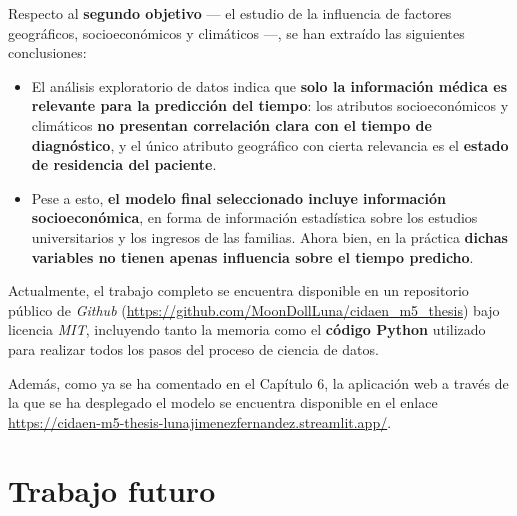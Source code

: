 Respecto al \textbf{segundo objetivo} --- el estudio de la influencia de factores geográficos, socioeconómicos y climáticos ---, se han extraído las siguientes conclusiones:
\begin{itemize}
	\item El análisis exploratorio de datos indica que \textbf{solo la información médica es relevante para la predicción del tiempo}: los atributos socioeconómicos y climáticos \textbf{no presentan correlación clara con el tiempo de diagnóstico}, y el único atributo geográfico con cierta relevancia es el \textbf{estado de residencia del paciente}.
	\item Pese a esto, \textbf{el modelo final seleccionado incluye información socioeconómica}, en forma de información estadística sobre los estudios universitarios y los ingresos de las familias. Ahora bien, en la práctica \textbf{dichas variables no tienen apenas influencia sobre el tiempo predicho}.
\end{itemize}

Actualmente, el trabajo completo se encuentra disponible en un repositorio público de \textit{Github} (\url{https://github.com/MoonDollLuna/cidaen_m5_thesis}) bajo licencia \textit{MIT}, incluyendo tanto la memoria como el \textbf{código Python} utilizado para realizar todos los pasos del proceso de ciencia de datos.

Además, como ya se ha comentado en el Capítulo 6, la aplicación web a través de la que se ha desplegado el modelo se encuentra disponible en el enlace \url{https://cidaen-m5-thesis-lunajimenezfernandez.streamlit.app/}.


\section{Trabajo futuro}

